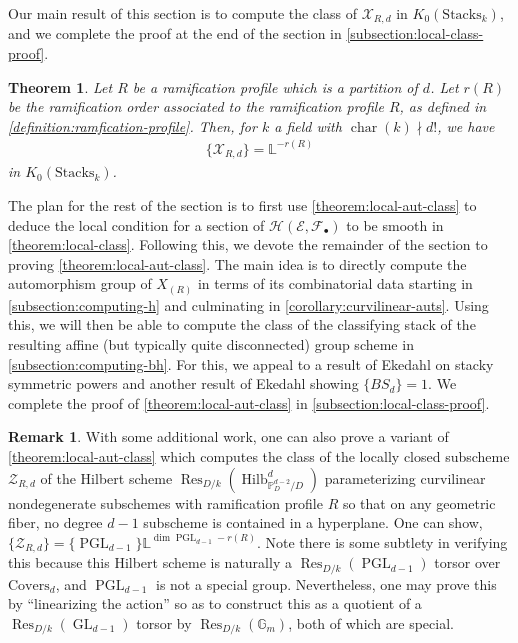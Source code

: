 \documentclass[12 pt]{amsart}
\theoremstyle{plain}
\newtheorem{theorem}[subsection]{Theorem}
\theoremstyle{definition}
\newtheorem{remark}[theorem]{Remark}
\theoremstyle{remark}
\numberwithin{equation}{section}
\newcommand\bg{\mathbb G}
\newcommand\bl{\mathbb L}
\newcommand\bp{\mathbb P}
\newcommand\sce{\mathscr E}
\newcommand\scf{\mathscr F}
\newcommand\sch{\mathscr H}
\newcommand\scx{\mathscr X}
\newcommand\scz{\mathscr Z}
\newcommand\coverstack[1]{\mathrm{Covers}_{d}} %
\newcommand\reshilb[2]{\scz_{#1,#2}} %
\newcommand\gerbe[2]{\scx_{#1,#2}} %
\DeclareMathOperator\res{Res}
\newcommand\grStacks{K_0(\mathrm{Stacks}_k)} %
\DeclareMathOperator\hilb{Hilb}
\DeclareMathOperator\pgl{PGL}
\DeclareMathOperator\chr{\operatorname{char}}
\DeclareMathOperator\gl{GL}
\begin{document}
Our main result of this section is to compute the class of $\gerbe R d$ in
$\grStacks$,
and we complete the proof at the end of the section in \autoref{subsection:local-class-proof}.
\begin{theorem}
	\label{theorem:local-aut-class} Let $R$ be a ramification profile which is
	a partition of $d$.
	Let $r(R)$ be
	the ramification order associated to the ramification profile $R$, as
	defined in \autoref{definition:ramfication-profile}. Then,
	for $k$ a field with $\chr(k) \nmid d!$, we have
	\begin{align*} \{\gerbe R d\} = \bl^{-r(R)} \end{align*} 
	in $\grStacks$.
\end{theorem} 
The plan for the rest of the section is to first use
\autoref{theorem:local-aut-class} to deduce
the local condition for a section of $\sch(\sce,\scf_\bullet)$ to be smooth
in \autoref{theorem:local-class}.
Following this, we devote the remainder of the section to proving
\autoref{theorem:local-aut-class}.
The main idea is to directly compute the automorphism group of $X_{(R)}$
in terms of its combinatorial data
starting in
\autoref{subsection:computing-h}
and culminating in 
\autoref{corollary:curvilinear-auts}.
Using this, we will then be able to compute the class of the classifying stack
of the resulting affine
(but typically quite disconnected)
group scheme
in \autoref{subsection:computing-bh}.
For this, we appeal to a result of Ekedahl on stacky symmetric powers and
another result of Ekedahl showing $\{BS_d\} =1$.
We complete
the proof of \autoref{theorem:local-aut-class} in \autoref{subsection:local-class-proof}.



\begin{remark}
	\label{remark:hilbert-scheme-variant}
	With some additional work, one can also prove a variant of
	\autoref{theorem:local-aut-class} which computes the class of the
	locally closed subscheme $\reshilb R d$
	of the Hilbert scheme $\res_{D/k} (\hilb_{\bp^{d-2}_D/D}^d)$
	parameterizing curvilinear nondegenerate subschemes with ramification
	profile $R$ so that on any geometric fiber, no degree $d - 1$
	subscheme is contained in a hyperplane.
	One can show, $\{\reshilb R d\} = \{\pgl_{d-1}\} \bl^{\dim \pgl_{d-1}-r(R)}$.
	Note there is some subtlety in verifying this because this Hilbert
	scheme is naturally a $\res_{D/k}(\pgl_{d-1})$ torsor over $\coverstack
	d$, and $\pgl_{d-1}$ is not a special group. Nevertheless,
	one may prove this by ``linearizing the action'' so as to construct this as a quotient
	of a $\res_{D/k}(\gl_{d-1})$ torsor by $\res_{D/k}(\bg_m)$,
	both of which are special.
\end{remark}
\end{document}
